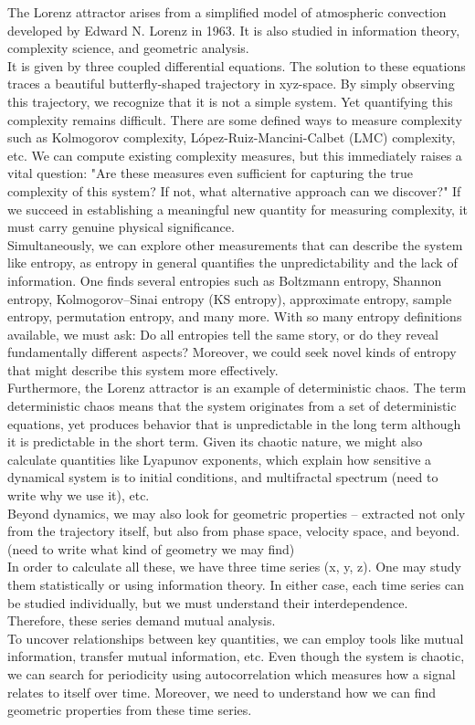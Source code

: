 \documentclass[%
 reprint,
 amsmath,amssymb,
 aps,
 floatfix,
]{revtex4-2}
\begin{document}
The Lorenz attractor arises from a simplified model of atmospheric convection developed by Edward N. Lorenz in 1963. It is also studied in information theory, complexity science, and geometric analysis.\\
It is given by three coupled differential equations. The solution to these equations traces a beautiful butterfly-shaped trajectory in xyz-space. By simply observing this trajectory, we recognize that it is not a simple system. Yet quantifying this complexity remains difficult. There are some defined ways to measure complexity such as Kolmogorov complexity, López-Ruiz-Mancini-Calbet (LMC) complexity, etc. 
We can compute existing complexity measures, but this immediately raises a vital question: "Are these measures even sufficient for capturing the true complexity of this system? If not, what alternative approach can we discover?"
If we succeed in establishing a meaningful new quantity for measuring complexity, it must carry genuine physical significance.\\
Simultaneously, we can explore other measurements that can describe the system like entropy, as entropy in general quantifies the unpredictability and the lack of information. One finds several entropies such as Boltzmann entropy, Shannon entropy, Kolmogorov–Sinai entropy (KS entropy), approximate entropy, sample entropy, permutation entropy, and many more. With so many entropy definitions available, we must ask: Do all entropies tell the same story, or do they reveal fundamentally different aspects? Moreover, we could seek novel kinds of entropy that might describe this system more effectively.\\
Furthermore, the Lorenz attractor is an example of deterministic chaos. The term deterministic chaos means that the system originates from a set of deterministic equations, yet produces behavior that is unpredictable in the long term although it is predictable in the short term. Given its chaotic nature, we might also calculate quantities like Lyapunov exponents, which explain how sensitive a dynamical system is to initial conditions, and multifractal spectrum (need to write why we use it), etc.\\
Beyond dynamics, we may also look for geometric properties – extracted not only from the trajectory itself, but also from phase space, velocity space, and beyond. (need to write what kind of geometry we may find)\\
In order to calculate all these, we have three time series (x, y, z). One may study them statistically or using information theory. In either case, each time series can be studied individually, but we must understand their interdependence. Therefore, these series demand mutual analysis.\\
To uncover relationships between key quantities, we can employ tools like mutual information, transfer mutual information, etc. Even though the system is chaotic, we can search for periodicity using autocorrelation which measures how a signal relates to itself over time. Moreover, we need to understand how we can find geometric properties from these time series.
\end{document}
